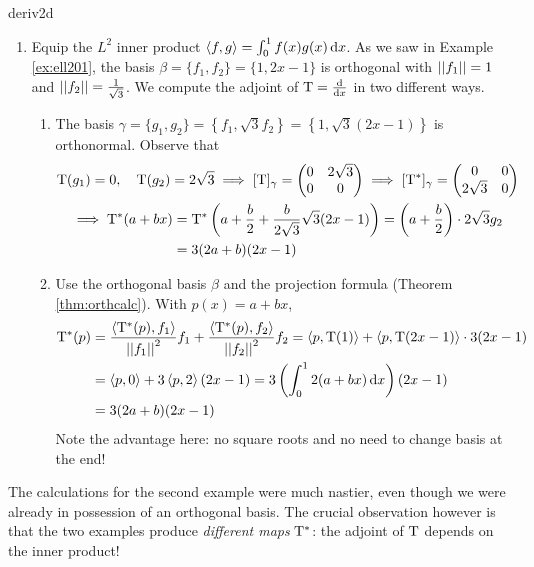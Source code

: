 \begin{examples}{}{deriv2d}
\begin{enumerate}
	  \item Equip the $L^2$ inner product $\left\langle f,g\right\rangle=\int_0^1f(x)g(x)\,{\mathrm{d} x}$. As we saw in Example \ref{ex:ell201}, the basis $\beta=\{f_1,f_2\}=\{1,2x-1\}$ is orthogonal with $\left| \left| f_1\right|\right|=1$ and $\left| \left| f_2\right|\right|=\frac 1{\sqrt 3}$. We compute the adjoint of $\mathrm{T}=\frac{\mathrm{d} }{\mathrm{d} x}$ in two different ways.
	  \begin{enumerate}
	    \item The basis $\gamma=\{g_1,g_2\}=\left\{f_1,\sqrt 3f_2\right\}=\left\{1,\sqrt 3(2x-1)\right\}$ is orthonormal. Observe that
	    \begin{gather*}
		    \mathrm{T}(g_1)=0,\quad \mathrm{T}(g_2)=2\sqrt 3
		    \implies [\mathrm{T}]_\gamma=
		    \begin{pmatrix}
			    0&2\sqrt 3\\
			    0&0
		    \end{pmatrix}
		    \implies [\mathrm{T}^*]_\gamma=
		    \begin{pmatrix}
			    0&0\\
			    2\sqrt 3&0
		    \end{pmatrix}\\
		    \begin{aligned}
		    	\implies \mathrm{T}^*(a+bx)
		    	&=\mathrm{T}^*\left(a+\frac b2+\frac b{2\sqrt 3}\sqrt 3(2x-1)\right) 
		    		=\left(a+\frac b2\right)\cdot 2\sqrt 3g_2\\
		    	&=3(2a+b)(2x-1)
		    \end{aligned}
	    \end{gather*}
	    \item Use the orthogonal basis $\beta$ and the projection formula (Theorem \ref{thm:orthcalc}). With $p(x)=a+bx$,
			\begin{align*}
				\mathrm{T}^*(p)
				&=\frac{\left\langle \mathrm{T}^*(p),f_1\right\rangle}{\left| \left| f_1\right|\right|^2}f_1 +\frac{\left\langle \mathrm{T}^*(p),f_2\right\rangle}{\left| \left| f_2\right|\right|^2}f_2 
				=\left\langle p,\mathrm{T}(1)\right\rangle +\left\langle p,\mathrm{T}(2x-1)\right\rangle\cdot 3(2x-1)\\
				&=\left\langle p,0\right\rangle +3\left\langle p,2\right\rangle(2x-1) 
					=3\left(\int_0^12(a+bx)\,{\mathrm{d} x}\right)(2x-1) \\
				&=3(2a+b)(2x-1)
			\end{align*}
			Note the advantage here: no square roots and no need to change basis at the end!
	  \end{enumerate}
	\end{enumerate}
	 The calculations for the second example were much nastier, even though we were already in possession of an orthogonal basis. The crucial observation however is that the two examples produce \emph{different maps} $\mathrm{T}^*$: the adjoint of $\mathrm{T}$ depends on the inner product! 
\end{examples}



